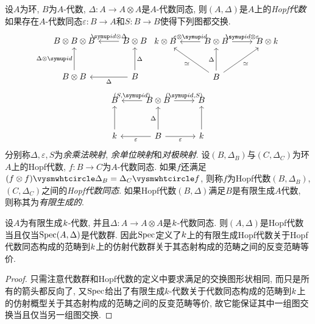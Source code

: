 \begin{definition}
  设$A$为环, $B$为$A$-代数, $\Delta\colon A\to A\otimes A$是$A$-代数同态, 则$(A, \Delta)$是$A$上的\emph{Hopf代数}如果存在$A$-代数同态$\varepsilon\colon B\to A$和$S\colon B\to B$使得下列图都交换.
  \begin{equation*}
    \begin{tikzcd}[row sep=large]
      B\otimes B\otimes B & B\otimes B\\
      B\otimes B & B
      \arrow[from=1-1,leftarrow]{1-2}{\id\otimes \Delta}
      \arrow[from=1-1,leftarrow]{2-1}[swap]{\Delta\otimes \id}
      \arrow[from=1-2,leftarrow]{2-2}{\Delta}
      \arrow[from=2-1,leftarrow]{2-2}[swap]{\Delta}
    \end{tikzcd}
    \quad
    \begin{tikzcd}[row sep=large]
      \kk\otimes B & B\otimes B & B\otimes \kk\\
      & B &
      \arrow[from=1-1,leftarrow]{1-2}{\varepsilon\otimes \id}
      \arrow[from=1-3,leftarrow]{1-2}[swap]{\id\otimes \varepsilon}
      \arrow[from=1-1,leftarrow]{2-2}[swap]{\simeq}
      \arrow[from=1-3,leftarrow]{2-2}{\simeq}
      \arrow[from=1-2,leftarrow]{2-2}[swap]{\Delta}
    \end{tikzcd}
  \end{equation*}
  \begin{equation*}
    \begin{tikzcd}[row sep=large]
      B & B\otimes B & B\\
      \kk & B & \kk
      \arrow[from=1-1,leftarrow]{1-2}{(S, \id)}
      \arrow[from=1-2,]{1-3}{(\id, S)}
      \arrow[from=2-1,leftarrow]{2-2}[swap]{\varepsilon}
      \arrow[from=2-2,]{2-3}[swap]{\varepsilon}
      \arrow[from=1-1,leftarrow]{2-1}[swap]{}
      \arrow[from=1-2,leftarrow]{2-2}[swap]{\Delta}
      \arrow[from=1-3,leftarrow]{2-3}{}
    \end{tikzcd}
  \end{equation*}
  分别称$\Delta, \varepsilon, S$为\emph{余乘法映射}, \emph{余单位映射}和\emph{对极映射}. 设$(B, \Delta_B)$与$(C, \Delta_C)$为环$A$上的Hopf代数, $f\colon B\to C$为$A$-代数同态. 如果$f$还满足$(f\otimes f)\composite\Delta_B=\Delta_C\composite f$, 则称$f$为Hopf代数$(B, \Delta_B)$, $(C, \Delta_C)$之间的\emph{Hopf代数同态}. 如果Hopf代数$(B, \Delta)$满足$B$是有限生成$A$代数, 则称其为\emph{有限生成的}.
\end{definition}

\begin{theorem}
  设$A$为有限生成$k$-代数, 并且$\Delta\colon A\to A\otimes A$是$k$-代数同态. 则$(A, \Delta)$是Hopf代数当且仅当$\operatorname{Spec}(A, \Delta)$是代数群. 因此$\operatorname{Spec}$定义了$k$上的有限生成Hopf代数关于Hopf代数同态构成的范畴到$k$上的仿射代数群关于其态射构成的范畴之间的反变范畴等价.
\end{theorem}

\begin{proof}
  只需注意代数群和Hopf代数的定义中要求满足的交换图形状相同, 而只是所有的箭头都反向了, 又$\operatorname{Spec}$给出了有限生成$k$-代数关于代数同态构成的范畴到$k$上的仿射概型关于其态射构成的范畴之间的反变范畴等价, 故它能保证其中一组图交换当且仅当另一组图交换.
\end{proof}

